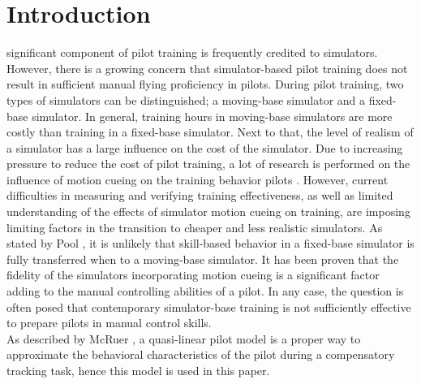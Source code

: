 \documentclass[conference]{IEEEtran}
\begin{document}




%
\IEEEpeerreviewmaketitle



\section{Introduction}
 significant component of pilot training is frequently credited to simulators. However, there is a growing concern that simulator-based pilot training does not result in sufficient manual flying proficiency in pilots.  During pilot training, two types of simulators can be distinguished; a moving-base simulator and a fixed-base simulator. In general, training hours in moving-base simulators are more costly than training in a fixed-base simulator. Next to that, the level of realism of a simulator has a large influence on the cost of the simulator. Due to increasing pressure to reduce the cost of pilot training, a lot of research is performed on the influence of motion cueing on the training behavior pilots \cite{hosman1999criteria}. However, current difficulties in measuring and verifying training effectiveness, as well as limited understanding of the effects of simulator motion cueing on training, are imposing limiting factors in the transition to cheaper and less realistic simulators. As stated by Pool \cite{pool2016effects}, it is unlikely that skill-based behavior in a fixed-base simulator is fully transferred when to a moving-base simulator. It has been proven that the fidelity of the simulators incorporating motion cueing is a significant factor adding to the manual controlling abilities of a pilot. In any case, the question is often posed that contemporary simulator-base training is not sufficiently effective to prepare pilots in manual control skills. \\

As described by McRuer \cite{mcruer1967review}, a quasi-linear pilot model is a proper way to approximate the behavioral characteristics of the pilot during a compensatory tracking task, hence this model is used in this paper.\\
\end{document}
